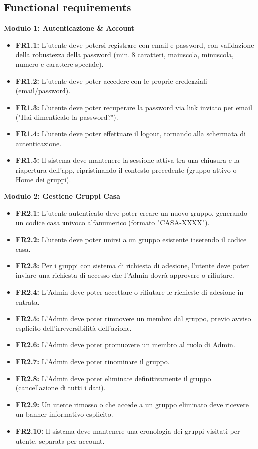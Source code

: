 \documentclass[12pt,a4paper]{article}
\begin{document}
\subsection{Functional requirements}

\textbf{Modulo 1: Autenticazione \& Account}
\begin{itemize}
    \item \textbf{FR1.1:} L'utente deve potersi registrare con email e password, con validazione della robustezza della password (min. 8 caratteri, maiuscola, minuscola, numero e carattere speciale).
    \item \textbf{FR1.2:} L'utente deve poter accedere con le proprie credenziali (email/password).
    \item \textbf{FR1.3:} L'utente deve poter recuperare la password via link inviato per email ("Hai dimenticato la password?").
    \item \textbf{FR1.4:} L'utente deve poter effettuare il logout, tornando alla schermata di autenticazione.
    \item \textbf{FR1.5:} Il sistema deve mantenere la sessione attiva tra una chiusura e la riapertura dell'app, ripristinando il contesto precedente (gruppo attivo o Home dei gruppi).
\end{itemize}

\textbf{Modulo 2: Gestione Gruppi Casa}
\begin{itemize}
    \item \textbf{FR2.1:} L'utente autenticato deve poter creare un nuovo gruppo, generando un codice casa univoco alfanumerico (formato "CASA-XXXX").
    \item \textbf{FR2.2:} L'utente deve poter unirsi a un gruppo esistente inserendo il codice casa.
    \item \textbf{FR2.3:} Per i gruppi con sistema di richiesta di adesione, l'utente deve poter inviare una richiesta di accesso che l'Admin dovrà approvare o rifiutare.
    \item \textbf{FR2.4:} L'Admin deve poter accettare o rifiutare le richieste di adesione in entrata.
    \item \textbf{FR2.5:} L'Admin deve poter rimuovere un membro dal gruppo, previo avviso esplicito dell'irreversibilità dell'azione.
    \item \textbf{FR2.6:} L'Admin deve poter promuovere un membro al ruolo di Admin.
    \item \textbf{FR2.7:} L'Admin deve poter rinominare il gruppo.
    \item \textbf{FR2.8:} L'Admin deve poter eliminare definitivamente il gruppo (cancellazione di tutti i dati).
    \item \textbf{FR2.9:} Un utente rimosso o che accede a un gruppo eliminato deve ricevere un banner informativo esplicito.
    \item \textbf{FR2.10:} Il sistema deve mantenere una cronologia dei gruppi visitati per utente, separata per account.
\end{itemize}
\end{document}
